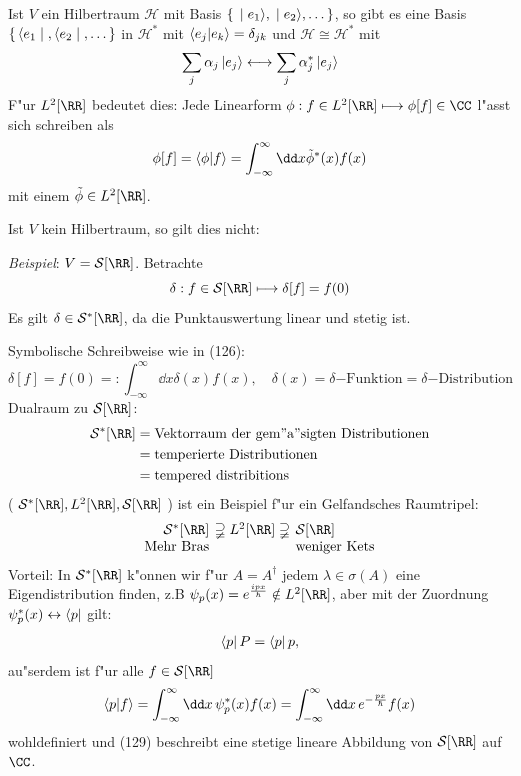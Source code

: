\documentclass[a4paper]{scrartcl}
\begin{document}
{Ist $V$ ein Hilbertraum $\mathcal H$ mit Basis $\set{ \ket{e_1}, \ket{e_2}, \ldots }$, so gibt es eine Basis $\set{ \bra{e_1}, \bra{e_2}, \ldots}$ in $\mathcal H^*$ mit $\braket{ e_j | e_k} = \delta_{jk}$ und $\mathcal H \cong \mathcal H^*$ mit
\begin{align}
\sum_j \alpha_j \ket{e_j} \longleftrightarrow \sum_j \alpha_j^* \ket{ e_j}
\end{align}
F"ur $L^2[\RR]$ bedeutet dies: Jede Linearform $\phi: f \in L^2[\RR] \longmapsto \phi[f] \in \CC$ l"asst sich schreiben als 
\begin{align}
\phi[f] = \braket{ \phi | f} = \int_{-\infty}^\infty \dd x \tilde \phi^*(x) f(x)
\end{align}
mit einem $\tilde \phi \in L^2[\RR]$.

Ist $V$ kein Hilbertraum, so gilt dies nicht:

\emph{Beispiel}: $V = \mathcal S[\RR]$. Betrachte
$$ \delta: f \in \mathcal S[\RR] \longmapsto \delta[f] = f(0)$$
Es gilt $\delta \in \mathcal{S}^*[\RR]$, da die Punktauswertung linear und stetig ist.

Symbolische Schreibweise wie in (126):
$$ \delta[f] = f(0) =: \int_{-\infty}^\infty \dd x \delta(x) f(x), \quad \delta(x) = \delta\mathrm{-Funktion} = \delta\mathrm{-Distribution}$$
Dualraum zu $\mathcal S[\RR]$:
\begin{align*}
\mathcal S^*[\RR] & = \mathrm{Vektorraum \ der \ gem"a"sigten \ Distributionen} \\
& = \mathrm{temperierte \ Distributionen} \\
& = \mathrm{tempered \ distribitions}
\end{align*}
( $\mathcal S^*[\RR], L^2[\RR], \mathcal S [\RR]$ ) ist ein Beispiel f"ur ein Gelfandsches Raumtripel:
\begin{align}
\mathrm{
\setlength{\tabcolsep}{2pt}
\begin{tabular}{r c l}
$\mathcal S^*[\RR]$ & $\supsetneqq L^2 [\RR] \supsetneqq$ & $\mathcal S[\RR]$ \\
Mehr Bras & & weniger Kets
\end{tabular}
}
\end{align}
Vorteil: In $\mathcal S^*[\RR]$ k"onnen wir f"ur $A = A^\dagger$ jedem $\lambda \in \sigma(A)$ eine Eigendistribution finden, z.B $\psi_p(x) = e^{\frac {i p x}{\hbar}} \notin L^2[\RR]$, aber mit der Zuordnung $\psi_p^*(x) \leftrightarrow \bra p$ gilt:
\begin{align}
\bra p P = \bra p p,
\end{align}
au"serdem ist  f"ur alle $f \in \mathcal S[\RR]$
\begin{align}
\braket{ p | f} = \int_{-\infty}^\infty \dd x \, \psi_p^*(x) f(x) = \int_{-\infty}^\infty \dd x \,  e^{- \frac{px}\hbar} f(x)
\end{align}
wohldefiniert und (129) beschreibt eine stetige lineare Abbildung von $\mathcal S[\RR]$ auf $\CC$.

}
\end{document}
